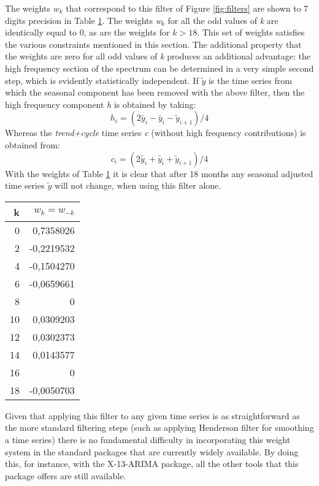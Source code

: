 \documentclass{article}
\begin{document}
The weights $w_k$ that correspond to this filter of Figure \ref{fig:filters} are shown to 7 digits precision in Table \ref{tab:digits}. The weights \textit{w$_k$} for all the odd values of \textit{k} are identically equal to 0, as are the weights for $ k>18$. This set of weights satisfies the various constraints mentioned in this section. The additional property that the weights are zero for all odd values of\textit{ k} produces an additional advantage: the high frequency section of the spectrum can be determined in a very simple second step, which is evidently statistically independent. If $\tilde y$ is the time series from which the seasonal component has been removed with the above filter, then the high frequency component \textit{h} is obtained by taking:
\begin{equation}
h_i = (2 \tilde{y_i} - \tilde{y_i} - \tilde{y}_{i+1})/4
\end{equation}
Whereas the \textit{trend+cycle} time series \textit{c} (without high frequency contributions) is obtained from:
\begin{equation}
c_i = (2\tilde{y_i}+\tilde{y_i}+\tilde{y}_{i+1})/4
\end{equation}
With the weights of Table \ref{tab:digits} it is clear that after 18 months any seasonal adjusted time series $\tilde y$ will not change, when using this filter alone.\\
\bigskip
\begin{table}[h]
\label{tab:digits}
\centering
\begin{tabular}{r r}
k & $w_k=w_{-k}$\\
\hline
0 & 0,7358026\\
2 & -0,2219532\\
4 & -0,1504270\\
6 & -0,0659661\\
8 & 0\\
10 & 0,0309203\\
12 & 0,0302373\\
14 & 0,0143577\\
16 & 0\\
18 & -0,0050703\\
\hline
\end{tabular}
\end{table}
Given that applying this filter to any given time series is as straightforward as the more standard filtering steps (such as applying Henderson filter for smoothing a time series) there is no fundamental difficulty in incorporating this weight system in the standard packages that are currently widely available. By doing this, for instance, with the X-13-ARIMA package, all the other tools that this package offers are still available.
\end{document}
